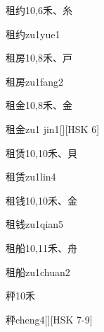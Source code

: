 \begin{Entry}{租约}{10,6}{⽲、⽷}
  \begin{Phonetics}{租约}{zu1yue1}
  \end{Phonetics}
\end{Entry}

\begin{Entry}{租房}{10,8}{⽲、⼾}
  \begin{Phonetics}{租房}{zu1fang2}
  \end{Phonetics}
\end{Entry}

\begin{Entry}{租金}{10,8}{⽲、⾦}
  \begin{Phonetics}{租金}{zu1 jin1}[][HSK 6]
  \end{Phonetics}
\end{Entry}

\begin{Entry}{租赁}{10,10}{⽲、⾙}
  \begin{Phonetics}{租赁}{zu1lin4}
  \end{Phonetics}
\end{Entry}

\begin{Entry}{租钱}{10,10}{⽲、⾦}
  \begin{Phonetics}{租钱}{zu1qian5}
  \end{Phonetics}
\end{Entry}

\begin{Entry}{租船}{10,11}{⽲、⾈}
  \begin{Phonetics}{租船}{zu1chuan2}
  \end{Phonetics}
\end{Entry}

\begin{Entry}{秤}{10}{⽲}
  \begin{Phonetics}{秤}{cheng4}[][HSK 7-9]
  \end{Phonetics}
\end{Entry}

